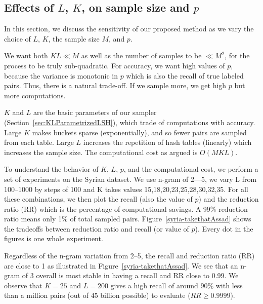 \documentclass[aoas]{imsart}
\begin{document}
\subsection{Effects of $L$, $K$, on sample size and $p$}
\label{sec:parameterstudy}
In this section, we discuss the sensitivity of our proposed method as we vary the choice of $L$, $K$, the sample size $M$, and $p$.

We want both $KL \ll M$ as well as the number of samples to be $\ll M^2$, for the process to be truly sub-quadratic. For accuracy, we want high values of $p$, because the variance is monotonic in $p$ which is also the recall of true labeled pairs. Thus, there is a natural trade-off. If we sample more, we get high $p$ but more computations.

$K$ and $L$ are the basic parameters of our sampler (Section~\ref{sec:KLParametrizedLSH}), which trade of computations with accuracy. Large $K$ makes buckets sparse (exponentially), and so fewer pairs are sampled from each table. Large $L$ increases the repetition of hash tables (linearly) which increases the sample size. The computational cost as argued is $O(MKL)$.

To understand the behavior of $K$, $L$, $p$, and the computational cost, we perform a set of experiments on the Syrian dataset.  We use n-gram of 2---5, we vary L from 100--1000 by steps of 100 and K takes values 15,18,20,23,25,28,30,32,35. For all these combinations, we then plot the recall (also the value of $p$) and the reduction ratio (RR) which is the percentage of computational savings. A 99\% reduction ratio means only 1\% of total sampled pairs. Figure~\ref{syria-takethatAssad} shows the tradeoffs between reduction ratio and recall (or value of $p$). Every dot in the figures is one whole experiment.

Regardless of the n-gram variation from 2--5, the recall and reduction ratio (RR) are close to 1 as illustrated in Figure~\ref{syria-takethatAssad}. We see that an n-gram of 3 overall is most stable in having a recall and RR close to 0.99. We observe that $K=25$ and $L=200$ gives a high recall of around 90\% with less than a million pairs (out of 45 billion possible) to evaluate ($RR \ge 0.9999$).
\end{document}

